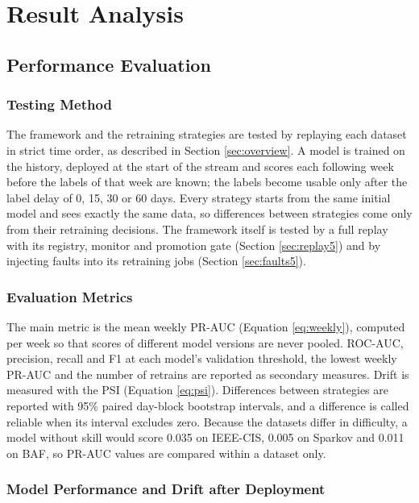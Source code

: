 \chapter{Result Analysis}

\section{Performance Evaluation}\label{sec:evaluation}

\subsection{Testing Method}\label{sec:testing}

The framework and the retraining strategies are tested by replaying each dataset in strict time order, as described in Section \ref{sec:overview}. A model is trained on the history, deployed at the start of the stream and scores each following week before the labels of that week are known; the labels become usable only after the label delay of 0, 15, 30 or 60 days. Every strategy starts from the same initial model and sees exactly the same data, so differences between strategies come only from their retraining decisions. The framework itself is tested by a full replay with its registry, monitor and promotion gate (Section \ref{sec:replay5}) and by injecting faults into its retraining jobs (Section \ref{sec:faults5}).

\subsection{Evaluation Metrics}\label{sec:metrics}

The main metric is the mean weekly PR-AUC (Equation \ref{eq:weekly}), computed per week so that scores of different model versions are never pooled. ROC-AUC, precision, recall and F1 at each model's validation threshold, the lowest weekly PR-AUC and the number of retrains are reported as secondary measures. Drift is measured with the PSI (Equation \ref{eq:psi}). Differences between strategies are reported with 95\% paired day-block bootstrap intervals, and a difference is called reliable when its interval excludes zero. Because the datasets differ in difficulty, a model without skill would score 0.035 on IEEE-CIS, 0.005 on Sparkov and 0.011 on BAF, so PR-AUC values are compared within a dataset only.

\subsection{Model Performance and Drift after Deployment}\label{sec:rq1}


